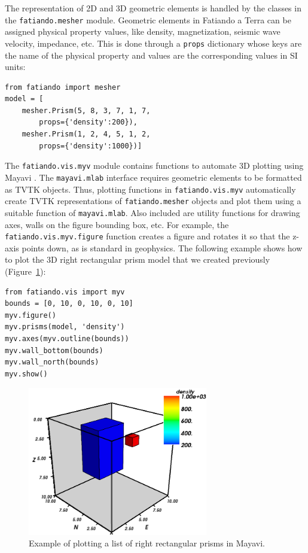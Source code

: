 The representation of 2D and 3D geometric elements is handled by the
classes in the \texttt{fatiando.mesher} module. Geometric elements in
Fatiando a Terra can be assigned physical property values, like density,
magnetization, seismic wave velocity, impedance, etc. This is done
through a \texttt{props} dictionary whose keys are the name of the
physical property and values are the corresponding values in SI units:

\begin{verbatim}
from fatiando import mesher
model = [
    mesher.Prism(5, 8, 3, 7, 1, 7,
        props={'density':200}),
    mesher.Prism(1, 2, 4, 5, 1, 2,
        props={'density':1000})]
\end{verbatim}

The \texttt{fatiando.vis.myv} module contains functions to automate 3D plotting
using Mayavi \citep{ramachandran2011}. The \texttt{mayavi.mlab} interface
requires geometric elements to be formatted as TVTK objects. Thus, plotting
functions in \texttt{fatiando.vis.myv} automatically create TVTK
representations of \texttt{fatiando.mesher} objects and plot them using a
suitable function of \texttt{mayavi.mlab}. Also included are utility functions
for drawing axes, walls on the figure bounding box, etc. For example, the
\texttt{fatiando.vis.myv.figure} function creates a figure and rotates it so
that the z-axis points down, as is standard in geophysics. The following
example shows how to plot the 3D right rectangular prism model that we created
previously (Figure~\ref{fig:p1-twoprisms}):

\begin{verbatim}
from fatiando.vis import myv
bounds = [0, 10, 0, 10, 0, 10]
myv.figure()
myv.prisms(model, 'density')
myv.axes(myv.outline(bounds))
myv.wall_bottom(bounds)
myv.wall_north(bounds)
myv.show()
\end{verbatim}

\begin{figure}
    \centering
    \includegraphics[width=0.7\textwidth]{figures/paper-fatiando/meshes_3dplotting_2prisms}
    \caption{
        Example of plotting a list of right rectangular prisms in Mayavi.
    }
    \label{fig:p1-twoprisms}
\end{figure}

